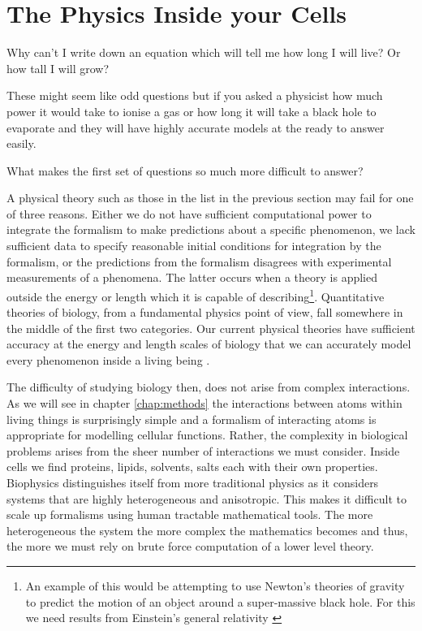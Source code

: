 

\section{The Physics Inside your Cells}

Why can't I write down an equation which will tell me how long I will live? Or how tall I will grow?

These might seem like odd questions but if you asked a physicist how much power it would take to ionise a gas or how long it will take a black hole to evaporate and they will have highly accurate models at the ready to answer easily. 

What makes the first set of questions so much more difficult to answer?

A physical theory such as those in the list in the previous section may fail for one of three reasons. Either we do not have sufficient computational power to integrate the formalism to make predictions about a specific phenomenon, we lack sufficient data to specify reasonable initial conditions for integration by the formalism, or the predictions from the formalism disagrees with experimental measurements of a phenomena. The latter occurs when a theory is applied outside the energy or length which it is capable of describing\footnote{An example of this would be attempting to use Newton's theories of gravity to predict the motion of an object around a super-massive black hole. For this we need results from Einstein's general relativity \cite{picker2022}}. Quantitative theories of biology, from a fundamental physics point of view, fall somewhere in the middle of the first two categories. Our current physical theories have sufficient accuracy at the energy and length scales of biology that we can accurately model every phenomenon inside a living being \cite{carroll2021}. 

 The difficulty of studying biology then, does not arise from complex interactions. As we will see in chapter \ref{chap:methods} the interactions between atoms within living things is surprisingly simple and a formalism of interacting atoms is appropriate for modelling cellular functions. Rather, the complexity in biological problems arises from the sheer number of interactions we must consider. Inside cells we find proteins, lipids, solvents, salts each with their own properties. Biophysics distinguishes itself from more traditional physics as it considers systems that are highly heterogeneous and anisotropic. This makes it difficult to scale up formalisms using human tractable mathematical tools. The more heterogeneous the system the more complex the mathematics becomes and thus, the more we must rely on brute force computation of a lower level theory.


